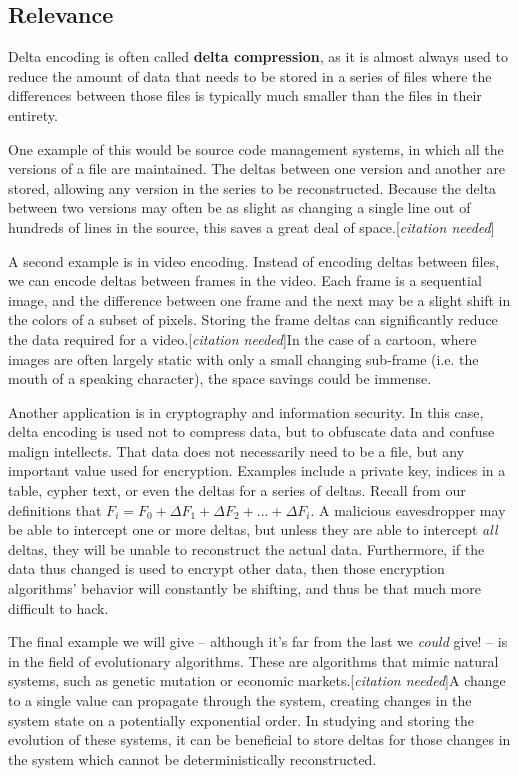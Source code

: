 \documentclass[12pt,a4paper]{article}
\newcommand{\citationNeeded}{[\textit{citation needed}]}
\begin{document}
		\subsection{Relevance}
		
		Delta encoding is often called \textbf{delta compression}, as it is almost always used to reduce the amount of data that needs to be stored in a series of files where the differences between those files is typically much smaller than the files in their entirety.
		
		One example of this would be source code management systems, in which all the versions of a file are maintained. The deltas between one version and another are stored, allowing any version in the series to be reconstructed. Because the delta between two versions may often be as slight as changing a single line out of hundreds of lines in the source, this saves a great deal of space.\citationNeeded
		
		A second example is in video encoding. Instead of encoding deltas between files, we can encode deltas between frames in the video. Each frame is a sequential image, and the difference between one frame and the next may be a slight shift in the colors of a subset of pixels. Storing the frame deltas can significantly reduce the data required for a video.\citationNeeded In the case of a cartoon, where images are often largely static with only a small changing sub-frame (i.e. the mouth of a speaking character), the space savings could be immense.
		
		Another application is in cryptography and information security. In this case, delta encoding is used not to compress data, but to obfuscate data and confuse malign intellects. That data does not necessarily need to be a file, but any important value used for encryption. Examples include a private key, indices in a table, cypher text, or even the deltas for a series of deltas.\cite{Crypto} Recall from our definitions that $F_i = F_0 + \Delta F_1 + \Delta F_2 + ... + \Delta F_i$. A malicious eavesdropper may be able to intercept one or more deltas, but unless they are able to intercept \textit{all} deltas, they will be unable to reconstruct the actual data. Furthermore, if the data thus changed is used to encrypt other data, then those encryption algorithms' behavior will constantly be shifting, and thus be that much more difficult to hack.
		
		The final example we will give -- although it's far from the last we \textit{could} give! -- is in the field of evolutionary algorithms. These are algorithms that mimic natural systems, such as genetic mutation or economic markets.\citationNeeded A change to a single value can propagate through the system, creating changes in the system state on a potentially exponential order. In studying and storing the evolution of these systems, it can be beneficial to store deltas for those changes in the system which cannot be deterministically reconstructed.
		
\end{document}
